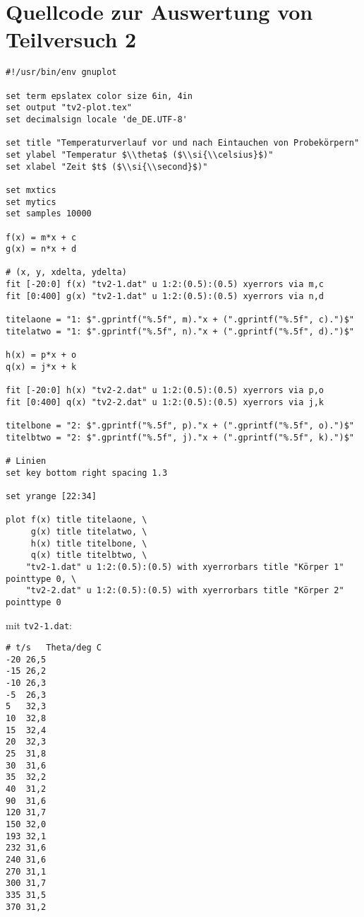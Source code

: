 \section{\gnuplot{} Quellcode zur Auswertung von Teilversuch 2}
    {  
        \renewcommand{\fcolorbox}[4][]{#4}
        \begin{verbatim}
#!/usr/bin/env gnuplot

set term epslatex color size 6in, 4in
set output "tv2-plot.tex"
set decimalsign locale 'de_DE.UTF-8'

set title "Temperaturverlauf vor und nach Eintauchen von Probekörpern"
set ylabel "Temperatur $\\theta$ ($\\si{\\celsius}$)"
set xlabel "Zeit $t$ ($\\si{\\second}$)"

set mxtics
set mytics
set samples 10000

f(x) = m*x + c
g(x) = n*x + d

# (x, y, xdelta, ydelta)
fit [-20:0] f(x) "tv2-1.dat" u 1:2:(0.5):(0.5) xyerrors via m,c
fit [0:400] g(x) "tv2-1.dat" u 1:2:(0.5):(0.5) xyerrors via n,d

titelaone = "1: $".gprintf("%.5f", m)."x + (".gprintf("%.5f", c).")$"
titelatwo = "1: $".gprintf("%.5f", n)."x + (".gprintf("%.5f", d).")$"

h(x) = p*x + o
q(x) = j*x + k

fit [-20:0] h(x) "tv2-2.dat" u 1:2:(0.5):(0.5) xyerrors via p,o
fit [0:400] q(x) "tv2-2.dat" u 1:2:(0.5):(0.5) xyerrors via j,k

titelbone = "2: $".gprintf("%.5f", p)."x + (".gprintf("%.5f", o).")$"
titelbtwo = "2: $".gprintf("%.5f", j)."x + (".gprintf("%.5f", k).")$"

# Linien
set key bottom right spacing 1.3

set yrange [22:34]

plot f(x) title titelaone, \
     g(x) title titelatwo, \
     h(x) title titelbone, \
     q(x) title titelbtwo, \
    "tv2-1.dat" u 1:2:(0.5):(0.5) with xyerrorbars title "Körper 1" pointtype 0, \
    "tv2-2.dat" u 1:2:(0.5):(0.5) with xyerrorbars title "Körper 2" pointtype 0
        \end{verbatim}
    }
    mit \texttt{tv2-1.dat}:
    \begin{multicols}{3}
        \begin{verbatim}
# t/s   Theta/deg C
-20 26,5
-15 26,2
-10 26,3
-5  26,3
5   32,3
10  32,8
15  32,4
20  32,3
25  31,8
30  31,6
35  32,2
40  31,2
90  31,6
120 31,7
150 32,0
193 32,1
232 31,6
240 31,6
270 31,1
300 31,7
335 31,5
370 31,2
        \end{verbatim}
    \end{multicols}
